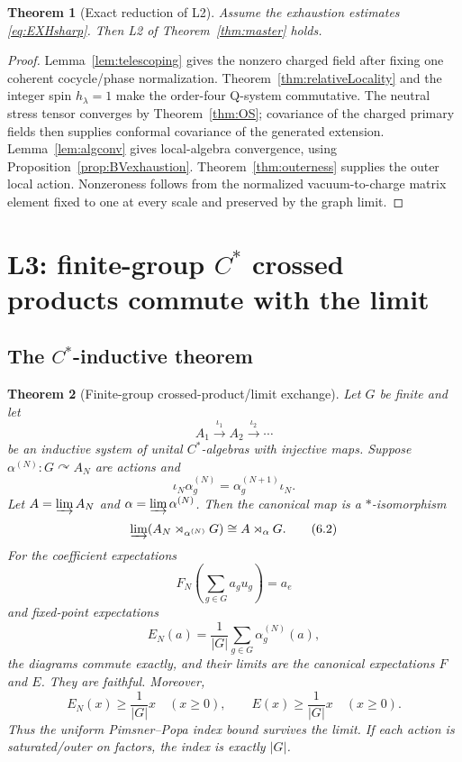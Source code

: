 \documentclass[11pt]{article}
\newtheorem{theorem}{Theorem}[section]
\theoremstyle{remark}
\begin{document}
\begin{theorem}[Exact reduction of L2]\label{thm:L2reduction}
Assume the exhaustion estimates \eqref{eq:EXHsharp}.  Then L2 of
Theorem~\ref{thm:master} holds.
\end{theorem}

\begin{proof}
Lemma~\ref{lem:telescoping} gives the nonzero charged field after fixing
one coherent cocycle/phase normalization.
Theorem~\ref{thm:relativeLocality} and the integer spin $h_\lambda=1$
make the order-four Q-system commutative.
The neutral stress tensor converges by Theorem~\ref{thm:OS}; covariance
of the charged primary fields then supplies conformal covariance of the
generated extension.  Lemma~\ref{lem:algconv} gives local-algebra
convergence, using Proposition~\ref{prop:BVexhaustion}.
Theorem~\ref{thm:outerness} supplies the outer local action.
Nonzeroness follows from the normalized vacuum-to-charge
matrix element fixed to one at every scale and preserved by the graph
limit.
\end{proof}

\section{\texorpdfstring{L3: finite-group $C^*$ crossed products commute with the limit}{L3: finite-group crossed products commute with the limit}}
\label{sec:L3}

\subsection{\texorpdfstring{The $C^*$-inductive theorem}{The C-star inductive theorem}}

\begin{theorem}[Finite-group crossed-product/limit exchange]
\label{thm:crossedlimit}
Let $G$ be finite and let
\[
 A_1\xrightarrow{\iota_1}A_2\xrightarrow{\iota_2}\cdots
\]
be an inductive system of unital $C^*$-algebras with injective maps.
Suppose $\alpha^{(N)}:G\curvearrowright A_N$ are actions and
\[
 \iota_N\alpha_g^{(N)}
 =\alpha_g^{(N+1)}\iota_N .
\tag{6.1}\label{eq:equivariance}
\]
Let $A=\varinjlim A_N$ and $\alpha=\varinjlim\alpha^{(N)}$.  Then the
canonical map is a $*$-isomorphism
\[
 \varinjlim(A_N\rtimes_{\alpha^{(N)}}G)
 \cong A\rtimes_\alpha G.
\tag{6.2}\label{eq:crossediso}
\]
For the coefficient expectations
\[
 F_N\!\left(\sum_{g\in G}a_gu_g\right)=a_e
\tag{6.3}\label{eq:coeffE}
\]
and fixed-point expectations
\[
 E_N(a)=\frac1{|G|}\sum_{g\in G}\alpha_g^{(N)}(a),
\tag{6.4}\label{eq:fixedE}
\]
the diagrams commute exactly, and their limits are the canonical
expectations $F$ and $E$.  They are faithful.  Moreover,
\[
 E_N(x)\ge\frac1{|G|}x\quad(x\ge0),
\qquad
 E(x)\ge\frac1{|G|}x\quad(x\ge0).
\tag{6.5}\label{eq:PP}
\]
Thus the uniform Pimsner--Popa index bound survives the limit.  If each
action is saturated/outer on factors, the index is exactly $|G|$.
\end{theorem}
\end{document}
